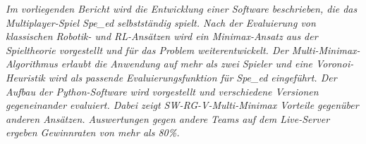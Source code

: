 \label{cha:abstrakt}

\emph{Im vorliegenden Bericht wird die Entwicklung einer Software beschrieben, die das Multiplayer-Spiel Spe\_ed selbstständig spielt. Nach der Evaluierung von klassischen Robotik- und RL-Ansätzen wird ein Minimax-Ansatz aus der Spieltheorie vorgestellt und für das Problem weiterentwickelt. Der Multi-Minimax-Algorithmus erlaubt die Anwendung auf mehr als zwei Spieler und eine Voronoi-Heuristik wird als passende Evaluierungsfunktion für Spe\_ed eingeführt. Der Aufbau der Python-Software wird vorgestellt und verschiedene Versionen gegeneinander evaluiert. Dabei zeigt SW-RG-V-Multi-Minimax Vorteile gegenüber anderen Ansätzen. Auswertungen gegen andere Teams auf dem Live-Server ergeben Gewinnraten von mehr als 80\%.}



